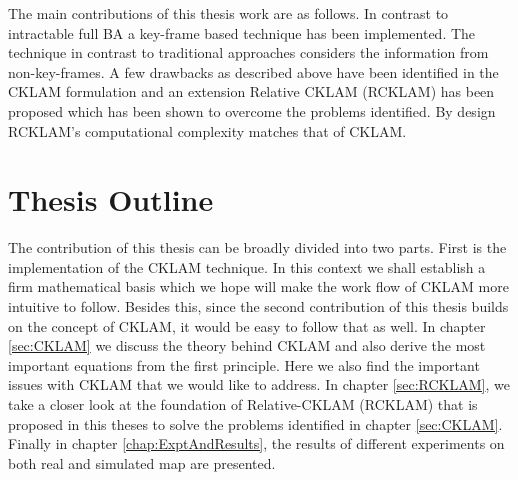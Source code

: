 The main contributions of this thesis work are as follows. In contrast to intractable full BA a key-frame based technique has been implemented. The technique in contrast to traditional approaches considers the information from non-key-frames. A few drawbacks as described above have been identified in the CKLAM formulation and an extension Relative CKLAM (RCKLAM) has been proposed which has been shown to overcome the problems identified. By design RCKLAM's computational complexity matches that of CKLAM. 

\section{Thesis Outline}
The contribution of this thesis can be broadly divided into two parts. First is the implementation of the CKLAM technique. In this context we shall establish a firm mathematical basis which we hope will make the work flow of CKLAM more intuitive to follow. Besides this, since the second contribution of this thesis builds on the concept of CKLAM, it would be easy to follow that as well. In chapter \ref {sec:CKLAM} we discuss the theory behind CKLAM and also derive the most important equations from the first principle. Here we also find the important issues with CKLAM that we would like to address. In chapter \ref{sec:RCKLAM}, we take a closer look at the foundation of Relative-CKLAM (RCKLAM) that is proposed in this theses to solve the problems identified in chapter \ref{sec:CKLAM}. Finally in chapter \ref{chap:ExptAndResults}, the results of different experiments on both real and simulated map are presented.
